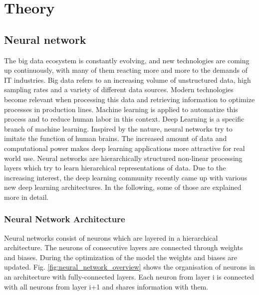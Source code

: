 \chapter{Theory}\label{chapter:theory}

\section{Neural network}
The big data ecosystem is constantly evolving, and new technologies are coming up continuously, with many of them reacting more and more to the demands of IT industries. Big data refers to an increasing volume of unstructured data, high sampling rates and a variety of different data sources. Modern technologies become relevant when processing this data and retrieving information to optimize processes in production lines. Machine learning is applied to automatize this process and to reduce human labor in this context. Deep Learning is a specific branch of machine learning. Inspired by the nature, neural networks try to imitate the function of human brains. The increased amount of data and computational power makes deep learning applications more attractive for real world use. Neural networks are hierarchically structured non-linear processing layers which try to learn hierarchical representations of data. Due to the increasing interest, the deep learning community recently came up with various new deep learning architectures. In the following, some of those are explained more in detail.

\subsection{Neural Network Architecture}
Neural networks consist of neurons which are layered in a hierarchical architecture. The neurons of consecutive layers are connected through weights and biases. During the optimization of the model the weights and biases are updated. Fig. \ref{fig:neural_network_overview} shows the organisation of neurons in an architecture with fully-connected layers. Each neuron from layer i is connected with all neurons from layer i+1 and shares information with them.

